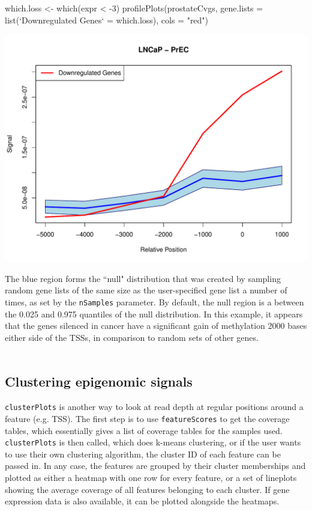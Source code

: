 \begin{Schunk}
\begin{Sinput}
 which.loss <- which(expr < -3)
 profilePlots(prostateCvgs,
              gene.lists = list(`Downregulated Genes` = which.loss),
              cols = "red")
\end{Sinput}
\end{Schunk}
\includegraphics{visualisations-profPlots}


\noindent The blue region forms the ``null" distribution that was created by sampling random gene lists of the same size as the user-specified gene list a number of times, as set by the \texttt{nSamples} parameter. By default, the null region is a between the 0.025 and 0.975 quantiles of the null distribution. In this example, it appears that the genes silenced in cancer have a significant gain of methylation 2000 bases either side of the TSSs, in comparison to random sets of other genes.
\ \\ \ \\

\subsection{Clustering epigenomic signals}

\texttt{clusterPlots} is another way to look at read depth at regular positions around a feature (e.g. TSS). The first step is to use \texttt{featureScores} to get the coverage tables, which essentially gives a list of coverage tables for the samples used. \texttt{clusterPlots} is then called, which does k-means clustering, or if the user wants to use their own clustering algorithm, the cluster ID of each feature can be passed in. In any case, the features are grouped by their cluster memberships and plotted as either a heatmap with one row for every feature, or a set of lineplots showing the average coverage of all features belonging to each cluster. If gene expression data is also available, it can be plotted alongside the heatmaps.

